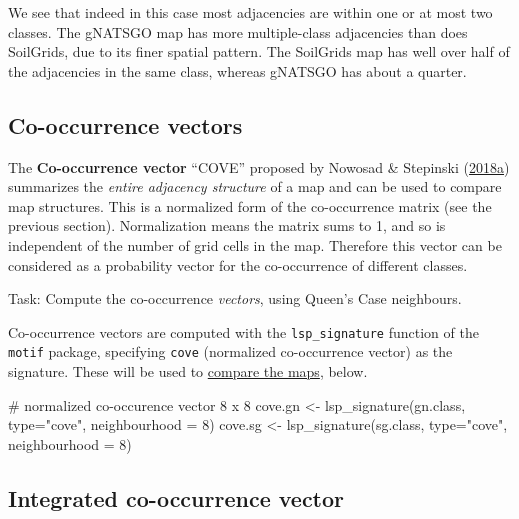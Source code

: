 \documentclass[
  letterpaper,
  DIV=11,
  numbers=noendperiod]{scrartcl}
\newenvironment{Shaded}{\begin{snugshade}}{\end{snugshade}}
\newcommand{\AttributeTok}[1]{\textcolor[rgb]{0.40,0.45,0.13}{#1}}
\newcommand{\CommentTok}[1]{\textcolor[rgb]{0.37,0.37,0.37}{#1}}
\newcommand{\DecValTok}[1]{\textcolor[rgb]{0.68,0.00,0.00}{#1}}
\newcommand{\FunctionTok}[1]{\textcolor[rgb]{0.28,0.35,0.67}{#1}}
\newcommand{\NormalTok}[1]{\textcolor[rgb]{0.00,0.23,0.31}{#1}}
\newcommand{\OtherTok}[1]{\textcolor[rgb]{0.00,0.23,0.31}{#1}}
\newcommand{\StringTok}[1]{\textcolor[rgb]{0.13,0.47,0.30}{#1}}
\begin{document}
We see that indeed in this case most adjacencies are within one or at
most two classes. The gNATSGO map has more multiple-class adjacencies
than does SoilGrids, due to its finer spatial pattern. The SoilGrids map
has well over half of the adjacencies in the same class, whereas gNATSGO
has about a quarter.

\hypertarget{sec-cove}{%
\subsection{Co-occurrence vectors}\label{sec-cove}}

The \textbf{Co-occurrence vector} ``COVE'' proposed by Nowosad \&
Stepinski
(\protect\hyperlink{ref-nowosadSpatialAssociationRegionalizations2018}{2018a})
summarizes the \emph{entire adjacency structure} of a map and can be
used to compare map structures. This is a normalized form of the
co-occurrence matrix (see the previous section). Normalization means the
matrix sums to 1, and so is independent of the number of grid cells in
the map. Therefore this vector can be considered as a probability vector
for the co-occurrence of different classes.

Task: Compute the co-occurrence \emph{vectors}, using Queen's Case
neighbours.

Co-occurrence vectors are computed with the \texttt{lsp\_signature}
function of the \texttt{motif} package, specifying \texttt{cove}
(normalized co-occurrence vector) as the signature. These will be used
to \href{@compare-cove}{compare the maps}, below.

\begin{Shaded}
\begin{Highlighting}[]
\CommentTok{\# normalized co{-}occurence vector 8 x 8}
\NormalTok{cove.gn }\OtherTok{\textless{}{-}} \FunctionTok{lsp\_signature}\NormalTok{(gn.class, }\AttributeTok{type=}\StringTok{"cove"}\NormalTok{, }\AttributeTok{neighbourhood =} \DecValTok{8}\NormalTok{)}
\NormalTok{cove.sg }\OtherTok{\textless{}{-}} \FunctionTok{lsp\_signature}\NormalTok{(sg.class, }\AttributeTok{type=}\StringTok{"cove"}\NormalTok{, }\AttributeTok{neighbourhood =} \DecValTok{8}\NormalTok{)}
\end{Highlighting}
\end{Shaded}

\hypertarget{incove}{%
\subsection{Integrated co-occurrence vector}\label{incove}}
\end{document}
